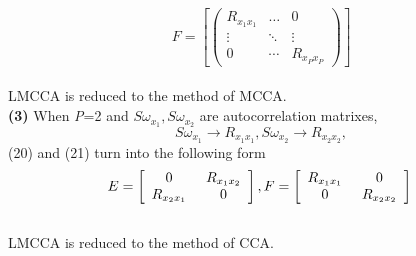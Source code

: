 \documentclass[journal]{IEEEtran}
\begin{document}
\begin{equation} \ F = \left[ {\left( {\begin{array}{*{20}{c}}
{{R_{{x_1}{x_1}}}}& \ldots &0\\
 \vdots & \ddots & \vdots \\
0& \cdots &{{R_{{x_P}{x_P}}}}
\end{array}} \right)} \right]
 \end{equation}\\\indent
LMCCA is reduced to the method of MCCA.\\

\textbf{(3)} When \emph{P}=2 and $ S{\omega _{x_1}}, S{\omega _{x_2}}$ are autocorrelation matrixes,
\begin{equation} \ S{\omega_{x_1}} \to {R_{{x_1}{x_1}}}, S{\omega_{{x_2}}} \to {R_{{x_2}{x_2}}}, \end{equation}
(20) and (21) turn into the following form
\begin{equation}
E = \left[ {\begin{array}{*{20}{c}}
   0  \\
   {{R_{{x_2}{x_1}}}}  \\
\end{array}} \right.\left. {\begin{array}{*{20}{c}}
   {{R_{{x_1}{x_2}}}}  \\
   {\rm{0}}  \\
\end{array}} \right],F = \left[ {\begin{array}{*{20}{c}}
   {{R_{{x_1}{x_1}}}}  \\
   0  \\
\end{array}} \right.\left. {\begin{array}{*{20}{c}}
   0  \\
   {{R_{{x_2}{x_2}}}}  \\
\end{array}} \right]
\end{equation}\\\indent
 LMCCA is reduced to the method of CCA.
\end{document}
